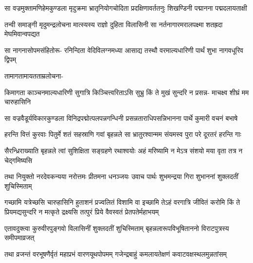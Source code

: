 \fourlineindentedshloka
{सा वज्रमुक्तामणिहेमकुण्डला}
{मृदुक्रमा भ्रातृनियोगचोदिता}
{प्रदक्षिणावर्ततनुः शिखण्डिनी}
{पद्मानना पद्मदलायताक्षी}


\fourlineindentedshloka
{तन्वी समाङ्गी मृदुमन्द्रलोचना}
{मात्स्यस्य राज्ञो दुहिता विलासिनी}
{सा नर्तनागारमरालपक्ष्मा}
{शतह्रदा मेघमिवान्वपद्यत}


\fourlineindentedshloka
{सा नागनासोपमसंहितोरू-}
{रनिन्दिता वेदिविलग्नमध्या}
{आसाद्य तस्थौ वरमाल्यधारिणी}
{पार्थं शुभा नागवधूरिव द्विपम्}


{तामागतामायतताम्रलोचना-\hspace{\shlokaspaceskip}}\\


\fourlineindentedshloka
{किमागता काञ्चनमाल्यधारिणी}
{सुगात्रि किञ्चित्त्वरिताऽसि सुभ्रु}
{किं ते मुखं सुन्दरि न प्रसन्न-}
{माचक्ष्व शीघ्रं मम चारुहासिनि}



\fourlineindentedshloka
{सा वज्रवैडूर्यविकारकुण्डला}
{विनिद्रपद्मोत्पलपन्नगन्धिनी}
{प्रसन्नताराधिपसन्निभानना}
{पार्थे कुमारी वचनं बभाषे}




\fourlineindentedshloka
{हरन्ति वित्तं कुरवाः पितुर्मे}
{शतं सहस्राणि गवां बृहन्नले}
{सा भ्रातुरश्वान्मम संयमस्व}
{पुरा परे दूरतरं हरन्ति गाः}


\fourlineindentedshloka
{सैरन्ध्रिराख्याति बृहन्नले त्वां}
{सुशिक्षिता सङ्ग्रहणे रथाश्वयोः}
{अहं मरिष्यामि न मेऽत्र संशयो}
{मया वृता तत्र न चेद्गमिष्यसि}



\fourlineindentedshloka
{तथा नियुक्तो नरदेवकन्यया}
{नरोत्तमः प्रीतमना धनञ्जयः}
{उवाच पार्थः शुभमन्द्रया गिरा}
{शुभाननां शुक्लदतीं शुचिस्मिताम्}


\sixlineindentedshloka
{गच्छामि यत्रेच्छसि चारुहासिनि}
{हुताशनं प्रज्वलितं विशामि वा}
{इच्छामि तेऽहं वरगात्रि जीवितं}
{करोमि किं ते प्रियमद्यसुन्दरि}
{न मत्कृते द्रक्ष्यसि तत्पुरं प्रिये}
{वैवस्वतं प्रेतपतेर्महाभयम्}



\fourlineindentedshloka
{एतावदुक्त्वा कुरुवीरपुङ्गवो}
{विलासिनीं शुक्लदतीं शुचिस्मिताम्}
{बृहन्नलारूपविभूषिताननो}
{विराटपुत्रस्य समीपमाव्रजत्}


\fourlineindentedshloka
{तथा व्रजन्तं वरभूषणैर्वृतं}
{महाप्रभं वारणयूथपोपमम्}
{गजेन्द्रबाहुं कमलायतेक्षणं}
{कवाटवक्षस्थलमुन्नतांसम्}


